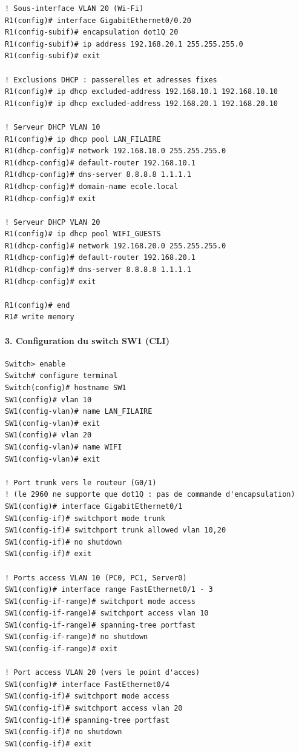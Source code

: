 \documentclass[11pt]{article}
\begin{document}
\begin{exoresolu}
\begin{lstlisting}
! Sous-interface VLAN 20 (Wi-Fi)
R1(config)# interface GigabitEthernet0/0.20
R1(config-subif)# encapsulation dot1Q 20
R1(config-subif)# ip address 192.168.20.1 255.255.255.0
R1(config-subif)# exit

! Exclusions DHCP : passerelles et adresses fixes
R1(config)# ip dhcp excluded-address 192.168.10.1 192.168.10.10
R1(config)# ip dhcp excluded-address 192.168.20.1 192.168.20.10

! Serveur DHCP VLAN 10
R1(config)# ip dhcp pool LAN_FILAIRE
R1(dhcp-config)# network 192.168.10.0 255.255.255.0
R1(dhcp-config)# default-router 192.168.10.1
R1(dhcp-config)# dns-server 8.8.8.8 1.1.1.1
R1(dhcp-config)# domain-name ecole.local
R1(dhcp-config)# exit

! Serveur DHCP VLAN 20
R1(config)# ip dhcp pool WIFI_GUESTS
R1(dhcp-config)# network 192.168.20.0 255.255.255.0
R1(dhcp-config)# default-router 192.168.20.1
R1(dhcp-config)# dns-server 8.8.8.8 1.1.1.1
R1(dhcp-config)# exit

R1(config)# end
R1# write memory
\end{lstlisting}

\paragraph{3. Configuration du switch SW1 (CLI)}
\begin{lstlisting}
Switch> enable
Switch# configure terminal
Switch(config)# hostname SW1
SW1(config)# vlan 10
SW1(config-vlan)# name LAN_FILAIRE
SW1(config-vlan)# exit
SW1(config)# vlan 20
SW1(config-vlan)# name WIFI
SW1(config-vlan)# exit

! Port trunk vers le routeur (G0/1)
! (le 2960 ne supporte que dot1Q : pas de commande d'encapsulation)
SW1(config)# interface GigabitEthernet0/1
SW1(config-if)# switchport mode trunk
SW1(config-if)# switchport trunk allowed vlan 10,20
SW1(config-if)# no shutdown
SW1(config-if)# exit

! Ports access VLAN 10 (PC0, PC1, Server0)
SW1(config)# interface range FastEthernet0/1 - 3
SW1(config-if-range)# switchport mode access
SW1(config-if-range)# switchport access vlan 10
SW1(config-if-range)# spanning-tree portfast
SW1(config-if-range)# no shutdown
SW1(config-if-range)# exit

! Port access VLAN 20 (vers le point d'acces)
SW1(config)# interface FastEthernet0/4
SW1(config-if)# switchport mode access
SW1(config-if)# switchport access vlan 20
SW1(config-if)# spanning-tree portfast
SW1(config-if)# no shutdown
SW1(config-if)# exit


\end{lstlisting}
\end{exoresolu}
\end{document}
